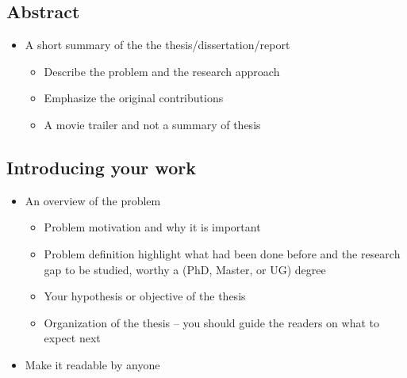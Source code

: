 \documentclass{utmthesis}
\begin{document}
\subsection{Abstract }
\begin{itemize}
\item A short summary of the the thesis/dissertation/report
\begin{itemize}
\item Describe the problem and the research approach
\item Emphasize the original contributions
\item A movie trailer and not a summary of thesis
\end{itemize}
\end{itemize}

\subsection{Introducing your work}
\begin{itemize}
\item An overview of the problem
\begin{itemize}
\item Problem motivation and why it is important
\item Problem definition highlight what had been done before and the research
gap to be studied, worthy a (PhD, Master, or UG) degree
\item Your hypothesis or objective of the thesis
\item Organization of the thesis -- you should guide the readers on what
to expect next
\end{itemize}
\item Make it readable by anyone
\end{itemize}
\end{document}
